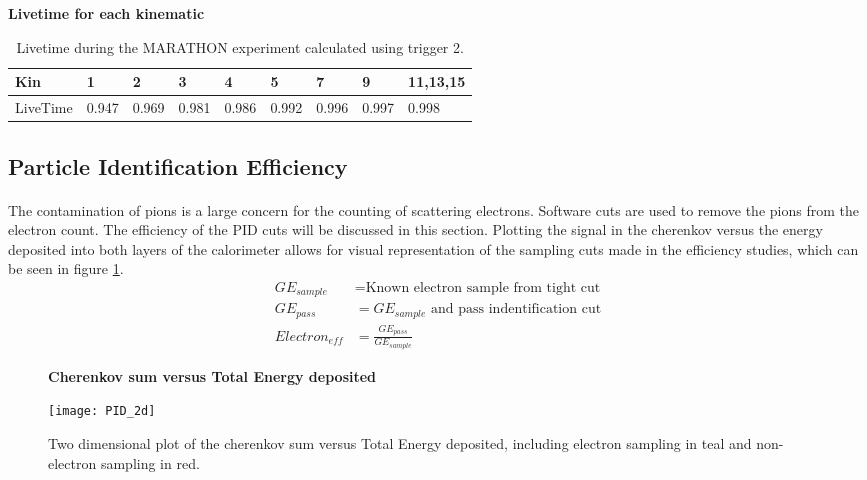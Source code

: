 \begin{table}[]
	\centering
	\textbf{Livetime for each kinematic }\par\medskip
	\begin{tabular}{|l|l|l|l|l|l|l|l|l|}
		\hline
		Kin      & 1 & 2 & 3 & 4 & 5 & 7 & 9 & 11,13,15 \\ \hline
		LiveTime & 0.947 & 0.969 & 0.981 & 0.986 & 0.992 & 0.996 & 0.997 & 0.998\\ \hline
	\end{tabular}
	\caption{Livetime during the MARATHON experiment calculated using trigger 2.  }
	\label{LTtable}
\end{table}
  

\subsection{Particle Identification Efficiency}\label{ss:PID}
\paragraph{} The contamination of pions is a large concern for the counting of scattering electrons. Software cuts are used to remove the pions from the electron count. The efficiency of the PID cuts will be discussed in this section. Plotting the signal in the cherenkov versus the energy deposited into both layers of the calorimeter allows for visual representation of the sampling cuts made in the efficiency studies, which can be seen in figure \ref{elesample}. 
\begin{equation}\label{effequ}
\begin{split}
GE_{sample} & = \textrm{Known electron sample from tight cut}  \\
GE_{pass} & = \textrm{$GE_{sample}$ and pass indentification cut} \\
Electron_{eff}  & = \frac{ GE_{pass} } { GE_{sample} } 
\end{split}
\end{equation}
\begin{figure}[]
	\centering
	\textbf{Cherenkov sum versus Total Energy deposited }\par\medskip
	\texttt{[image: PID\_2d]}
	\caption{Two dimensional plot of the cherenkov sum versus Total Energy deposited, including electron sampling in teal and non-electron sampling in red. }
	\label{elesample}
\end{figure}

